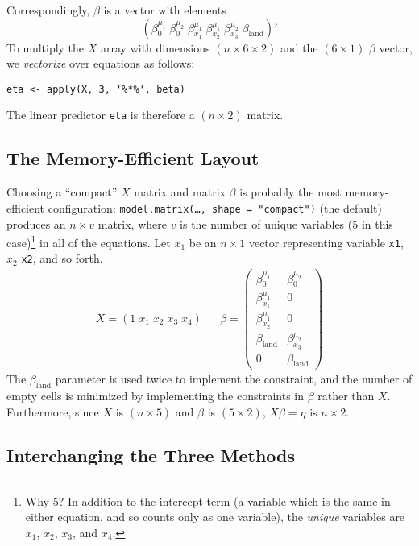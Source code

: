 Correspondingly, $\beta$ is a vector with elements
\begin{equation*}
(\beta_0^{\mu_1} \; \beta_0^{\mu_2} \; \beta_{x_1}^{\mu_1} \;
\beta_{x_2}^{\mu_1} \; \beta_{x_3}^{\mu_2} \; \beta_{\textrm{land}})\prime
\end{equation*}
To multiply the $X$ array with dimensions $(n \times 6 \times 2)$ and
the $(6 \times 1)$ $\beta$ vector, we \emph{vectorize} over equations
as follows:  
\begin{verbatim}
eta <- apply(X, 3, '%*%', beta) 
\end{verbatim} 
The linear predictor {\tt eta} is therefore a $(n \times 2)$ matrix.  

\subsection{The Memory-Efficient Layout}  

Choosing a ``compact'' $X$ matrix and matrix $\beta$ is probably the most
memory-efficient configuration: {\tt model.matrix(\dots,
shape = "compact")} (the default) produces an $n \times v$ matrix,
where $v$ is the number of unique variables (5 in this
case)\footnote{Why 5? In addition to the intercept term (a variable
which is the same in either equation, and so counts only as one
variable), the \emph{unique} variables are $x_1$, $x_2$, $x_3$, and
$x_4$.} in all of the equations.  Let $x_1$ be an $n \times 1$ vector
representing variable {\tt x1}, $x_2$ {\tt x2}, and so forth.
\begin{eqnarray*}
X = (1 \; x_1 \; x_2 \; x_3 \; x_4) & & \beta = \left( \begin{array}{cc}

	   \beta_0^{\mu_1}       & \beta_0^{\mu_2} \\
\beta_{x_1}^{\mu_1}       & 0 \\
\beta_{x_2}^{\mu_1}       & 0 \\
\beta_{\textrm{land}} & \beta_{x_3}^{\mu_2} \\
0                     & \beta_{\textrm{land}}
\end{array} \right) 
\end{eqnarray*}
The $\beta_{\textrm{land}}$ parameter is used twice to implement the
constraint, and the number of empty cells is minimized by implementing
the constraints in $\beta$ rather than $X$.  Furthermore, since $X$ is
$(n \times 5)$ and $\beta$ is $(5 \times 2)$, $X\beta = \eta$ is $n
\times 2$.

\subsection{Interchanging the Three Methods}  
\label{bivariate.probit.llik} 

